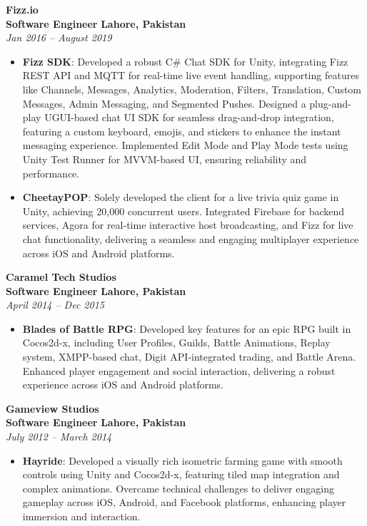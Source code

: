 \documentclass[11pt]{article}
\begin{document}
\newpage
\textbf{Fizz.io} \\
\textbf{Software Engineer} \hfill \textbf{Lahore, Pakistan} \\
\textit{Jan 2016 -- August 2019}
\begin{itemize}
	\item \textbf{Fizz SDK}: Developed a robust C\# Chat SDK for Unity, integrating Fizz REST API and MQTT for real-time live event handling, supporting features like Channels, Messages, Analytics, Moderation, Filters, Translation, Custom Messages, Admin Messaging, and Segmented Pushes. Designed a plug-and-play UGUI-based chat UI SDK for seamless drag-and-drop integration, featuring a custom keyboard, emojis, and stickers to enhance the instant messaging experience. Implemented Edit Mode and Play Mode tests using Unity Test Runner for MVVM-based UI, ensuring reliability and performance.
	\item \textbf{CheetayPOP}: Solely developed the client for a live trivia quiz game in Unity, achieving 20,000 concurrent users. Integrated Firebase for backend services, Agora for real-time interactive host broadcasting, and Fizz for live chat functionality, delivering a seamless and engaging multiplayer experience across iOS and Android platforms.
\end{itemize}
\textbf{Caramel Tech Studios} \\
\textbf{Software Engineer} \hfill \textbf{Lahore, Pakistan} \\
\textit{April 2014 -- Dec 2015}
\begin{itemize}
	\item \textbf{Blades of Battle RPG}: Developed key features for an epic RPG built in Cocos2d-x, including User Profiles, Guilds, Battle Animations, Replay system, XMPP-based chat, Digit API-integrated trading, and Battle Arena. Enhanced player engagement and social interaction, delivering a robust experience across iOS and Android platforms.
\end{itemize}
\textbf{Gameview Studios} \\
\textbf{Software Engineer} \hfill \textbf{Lahore, Pakistan} \\
\textit{July 2012 -- March 2014}
\begin{itemize}
	\item \textbf{Hayride}: Developed a visually rich isometric farming game with smooth controls using Unity and Cocos2d-x, featuring tiled map integration and complex animations. Overcame technical challenges to deliver engaging gameplay across iOS, Android, and Facebook platforms, enhancing player immersion and interaction.
\end{itemize}
\end{document}
